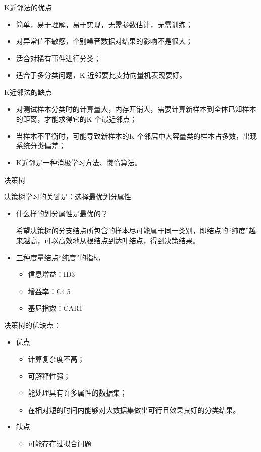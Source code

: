\textcolor{main1}{K近邻法的优点}
\begin{itemize}
    \item 简单，易于理解，易于实现，无需参数估计，无需训练；
    \item 对异常值不敏感，个别噪音数据对结果的影响不是很大；
    \item 适合对稀有事件进行分类；
    \item 适合于多分类问题，K 近邻要比支持向量机表现要好。
\end{itemize}
\textcolor{main1}{K近邻法的缺点}
\begin{itemize}
    \item 对测试样本分类时的计算量大，内存开销大，需要计算新样本到全体已知样本的距离，才能求得它的K 个最近邻点；
    \item 当样本不平衡时，可能导致新样本的K 个邻居中大容量类的样本占多数，出现系统分类偏差；
    \item K近邻是一种消极学习方法、懒惰算法。
\end{itemize}

\textcolor{main1}{决策树}

\begin{note}
    决策树学习的关键是：选择最优划分属性
    \begin{itemize}
        \item 什么样的划分属性是最优的？
        
        希望决策树的分支结点所包含的样本尽可能属于同一类别，即结点的“纯度”越来越高，可以高效地从根结点到达叶结点，得到决策结果。
        \item 三种度量结点“纯度”的指标
        \begin{itemize}
            \item 信息增益：ID3
            \item 增益率：C4.5
            \item 基尼指数：CART
        \end{itemize}
    \end{itemize}
\end{note}
\begin{note}
    决策树的优缺点：
    \begin{itemize}
        \item 优点
        \begin{itemize}
            \item 计算复杂度不高；
            \item 可解释性强；
            \item 能处理具有许多属性的数据集；
            \item 在相对短的时间内能够对大数据集做出可行且效果良好的分类结果。
        \end{itemize} 
        \item 缺点
        \begin{itemize}
            \item 可能存在过拟合问题
        \end{itemize} 
    \end{itemize}
\end{note}


